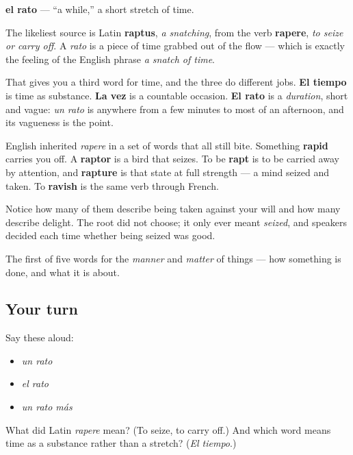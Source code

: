 \begin{cousinweb}
\textbf{el rato} — \textquotedblleft{}a while,\textquotedblright{} a short stretch of time.

The likeliest source is Latin \textbf{raptus}, \emph{a snatching}, from the verb \textbf{rapere}, \emph{to seize or carry off}. A \emph{rato} is a piece of time grabbed out of the flow — which is exactly the feeling of the English phrase \emph{a snatch of time}.

That gives you a third word for time, and the three do different jobs. \textbf{El tiempo} is time as substance. \textbf{La vez} is a countable occasion. \textbf{El rato} is a \emph{duration}, short and vague: \emph{un rato} is anywhere from a few minutes to most of an afternoon, and its vagueness is the point.

English inherited \emph{rapere} in a set of words that all still bite. Something \textbf{rapid} carries you off. A \textbf{raptor} is a bird that seizes. To be \textbf{rapt} is to be carried away by attention, and \textbf{rapture} is that state at full strength — a mind seized and taken. To \textbf{ravish} is the same verb through French.

Notice how many of them describe being taken against your will and how many describe delight. The root did not choose; it only ever meant \emph{seized}, and speakers decided each time whether being seized was good.
\end{cousinweb}

\begin{grammarlens}[title={What you've built}]
The first of five words for the \emph{manner} and \emph{matter} of things — how something is done, and what it is about.
\end{grammarlens}

\subsection*{Your turn}
Say these aloud:

\begin{itemize}
\raggedright
  \item \emph{un rato}
  \item \emph{el rato}
  \item \emph{un rato más}
\end{itemize}

\begin{tcolorbox}[breakable,colback=teal!4,colframe=teal!35!black,title={Before you move on}]
What did Latin \emph{rapere} mean? (To seize, to carry off.) And which word means time as a substance rather than a stretch? (\emph{El tiempo}.)
\end{tcolorbox}
